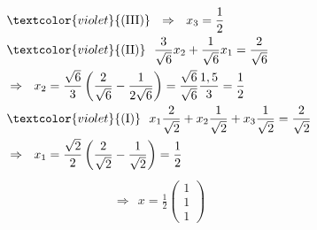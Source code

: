 {\begin{enumerate}
\begin{enumerate}
\begin{align*}
		\end{align*}
		\begin{align*}
		&\textcolor{violet}{(\text{III})}~~\Rightarrow~~ x_3=\frac{1}{2}\\
		&\textcolor{violet}{(\text{II})}~~\frac{3}{\sqrt{6}}x_2 +\frac{1}{\sqrt{6}}x_1 = \frac{2}{\sqrt{6}}\\
		&\Rightarrow~~x_2 = \frac{\sqrt{6}}{3}\left(\frac{2}{\sqrt{6}}-\frac{1}{2\sqrt{6}}\right) = \frac{\sqrt{6}}{\sqrt{6}}\frac{1,5}{3} = \frac{1}{2}\\
		&\textcolor{violet}{(\text{I})}~~x_1\frac{2}{\sqrt{2}}+x_2\frac{1}{\sqrt{2}}+x_3\frac{1}{\sqrt{2}} = \frac{2}{\sqrt{2}}\\
		&\Rightarrow~~x_1 = \frac{\sqrt{2}}{2}\left(\frac{2}{\sqrt{2}}-\frac{1}{\sqrt{2}}\right) = \frac{1}{2}
		\end{align*}
		\begin{align*}
		\Rightarrow~~x=\frac{1}{2}
		\begin{pmatrix}1\\1\\1\end{pmatrix}
		\end{align*}
	\end{enumerate}
	
\end{enumerate}
}